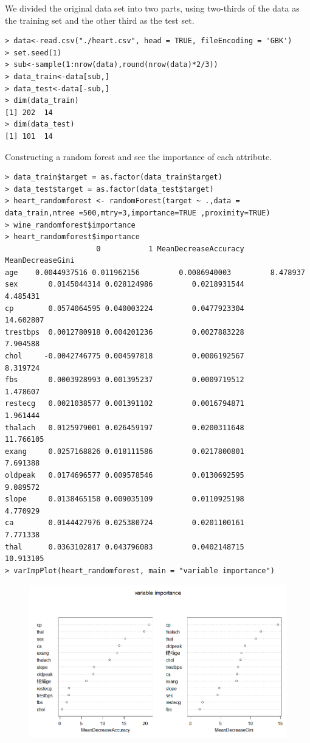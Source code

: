\documentclass{article}
\begin{document}
We divided the original data set into two parts, using two-thirds of the data as the training set and the other third as the test set.
\begin{lstlisting}
> data<-read.csv("./heart.csv", head = TRUE, fileEncoding = 'GBK')
> set.seed(1)
> sub<-sample(1:nrow(data),round(nrow(data)*2/3))
> data_train<-data[sub,]
> data_test<-data[-sub,]
> dim(data_train)
[1] 202  14
> dim(data_test) 
[1] 101  14
\end{lstlisting}
Constructing a random forest and see the importance of each attribute.
\begin{lstlisting}
> data_train$target = as.factor(data_train$target)
> data_test$target = as.factor(data_test$target)
> heart_randomforest <- randomForest(target ~ .,data = data_train,ntree =500,mtry=3,importance=TRUE ,proximity=TRUE)
> wine_randomforest$importance
> heart_randomforest$importance
                     0           1 MeanDecreaseAccuracy MeanDecreaseGini
age    0.0044937516 0.011962156         0.0086940003         8.478937
sex       0.0145044314 0.028124986         0.0218931544         4.485431
cp        0.0574064595 0.040003224         0.0477923304        14.602807
trestbps  0.0012780918 0.004201236         0.0027883228         7.904588
chol     -0.0042746775 0.004597818         0.0006192567         8.319724
fbs       0.0003928993 0.001395237         0.0009719512         1.478607
restecg   0.0021038577 0.001391102         0.0016794871         1.961444
thalach   0.0125979001 0.026459197         0.0200311648        11.766105
exang     0.0257168826 0.018111586         0.0217800801         7.691388
oldpeak   0.0174696577 0.009578546         0.0130692595         9.089572
slope     0.0138465158 0.009035109         0.0110925198         4.770929
ca        0.0144427976 0.025380724         0.0201100161         7.771338
thal      0.0363102817 0.043796083         0.0402148715        10.913105
> varImpPlot(heart_randomforest, main = "variable importance")
\end{lstlisting}
 \begin{figure}[H]
\centering
  \includegraphics[width=1\textwidth]{1-3-1.png} %

\end{figure}
\end{document}
